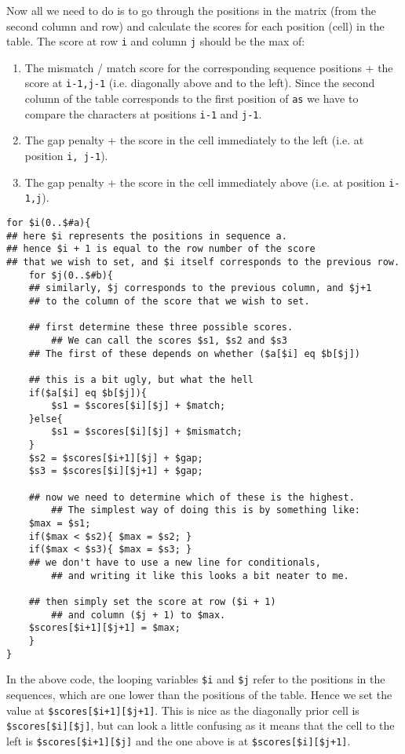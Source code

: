 \documentclass[11pt]{article}
\renewcommand\scriptsize\normalsize
\begin{document}
Now all we need to do is to go through the positions in the matrix (from the
second column and row) and calculate the scores for each position (cell) in
the table. The score at row \texttt{i} and column \texttt{j} should be the max
of:
\begin{enumerate}
\item The mismatch / match score for the corresponding sequence positions +
  the score at \texttt{i-1,j-1} (i.e. diagonally above and to the left). Since
  the second column of the table corresponds to the first position of
  \texttt{as} we have to compare the characters at positions \texttt{i-1} and
  \texttt{j-1}.
\item The gap penalty + the score in the cell immediately to the left (i.e. at
  position \texttt{i, j-1}).
\item The gap penalty + the score in the cell immediately above (i.e. at
  position \texttt{i-1,j}).
\end{enumerate}

\begin{verbatim}
for $i(0..$#a){    
## here $i represents the positions in sequence a.
## hence $i + 1 is equal to the row number of the score
## that we wish to set, and $i itself corresponds to the previous row.
    for $j(0..$#b){
	## similarly, $j corresponds to the previous column, and $j+1
	## to the column of the score that we wish to set.
	
	## first determine these three possible scores. 
        ## We can call the scores $s1, $s2 and $s3 
	## The first of these depends on whether ($a[$i] eq $b[$j])
	
	## this is a bit ugly, but what the hell
	if($a[$i] eq $b[$j]){
	    $s1 = $scores[$i][$j] + $match;
	}else{
	    $s1 = $scores[$i][$j] + $mismatch;
	}
	$s2 = $scores[$i+1][$j] + $gap;
	$s3 = $scores[$i][$j+1] + $gap;

	## now we need to determine which of these is the highest. 
        ## The simplest way of doing this is by something like:
	$max = $s1;
	if($max < $s2){ $max = $s2; }
	if($max < $s3){ $max = $s3; }
	## we don't have to use a new line for conditionals, 
        ## and writing it like this looks a bit neater to me.
	
	## then simply set the score at row ($i + 1) 
        ## and column ($j + 1) to $max.
	$scores[$i+1][$j+1] = $max;
    }
}
\end{verbatim}

In the above code, the looping variables \texttt{\$i} and \texttt{\$j} refer
to the positions in the sequences, which are one lower than the positions of
the table. Hence we set the value at \texttt{\$scores[\$i+1][\$j+1]}. This is
nice as the diagonally prior cell is \texttt{\$scores[\$i][\$j]}, but can look
a little confusing as it means that the cell to the left is
\texttt{\$scores[\$i+1][\$j]} and the one above is at
\texttt{\$scores[\$i][\$j+1]}.
\end{document}
